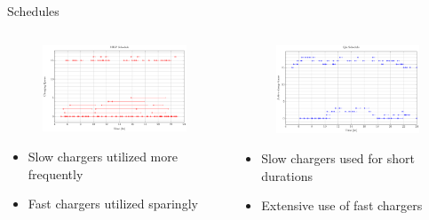\documentclass[aspectratio=169,dvipsnames]{beamer}
\begin{document}
\begin{frame}[label={sec:org8d3682a}]{Schedules}
\begin{columns}
\begin{column}{0.5\columnwidth}
\begin{figure}[htpb]
\centering
    \includegraphics[width=\textwidth]{img/milp-pap/schedule-milp-pap}
\end{figure}

\begin{itemize}
\item Slow chargers utilized more frequently
\item Fast chargers utilized sparingly
\end{itemize}
\end{column}

\begin{column}{0.5\columnwidth}
\begin{figure}[htpb]
\centering
    \includegraphics[width=\textwidth]{img/milp-pap/schedule-qin}
\end{figure}

\begin{itemize}
\item Slow chargers used for short durations
\item Extensive use of fast chargers
\end{itemize}
\end{column}
\end{columns}
\end{frame}
\end{document}
